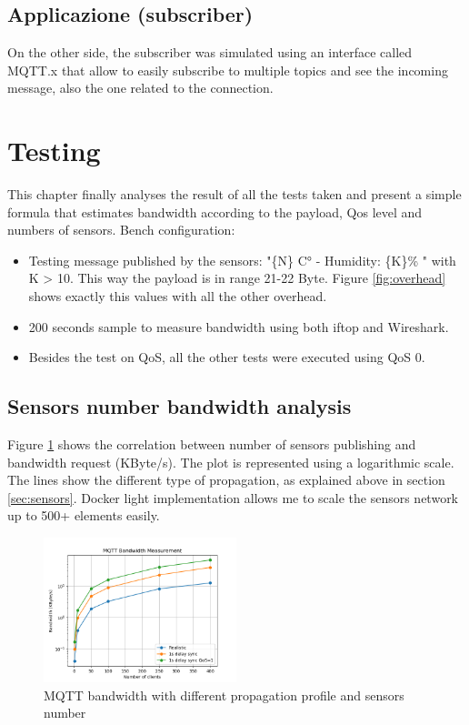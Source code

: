 \documentclass[journal]{IEEEtran}
\begin{document}
\subsection{Applicazione (subscriber)}
On the other side, the subscriber was simulated using an interface called MQTT.x that allow to easily subscribe to multiple topics and see the incoming message, also the one related to the connection. 

\section{Testing}
This chapter finally analyses the result of all the tests taken and present a simple formula that estimates bandwidth according to the payload, Qos level and numbers of sensors. 
Bench configuration: 
\begin{itemize}
	\item Testing message published by the sensors: "\{N\} C° - Humidity: \{K\}\% " with K > 10. This way the payload is in range 21-22 Byte. Figure \ref{fig:overhead} shows exactly this values with all the other overhead. 
	\item 200 seconds sample to measure bandwidth using both iftop and Wireshark. 
	\item Besides the test on QoS, all the other tests were executed using QoS 0. 
\end{itemize}

\subsection{Sensors number bandwidth analysis}
Figure \ref{fig:sensors} shows the correlation between number of sensors publishing and bandwidth request (KByte/s). The plot is represented using a logarithmic scale. The lines show the different type of propagation, as explained above in section \ref{sec:sensors}. Docker light implementation allows me to scale the sensors network up to 500+ elements easily.

\begin{figure}[h]
	\centering
	\includegraphics[width=0.50\textwidth]{sensors}
	\caption{MQTT bandwidth with different propagation profile and sensors number}
	\label{fig:sensors}
\end{figure}
\end{document}
